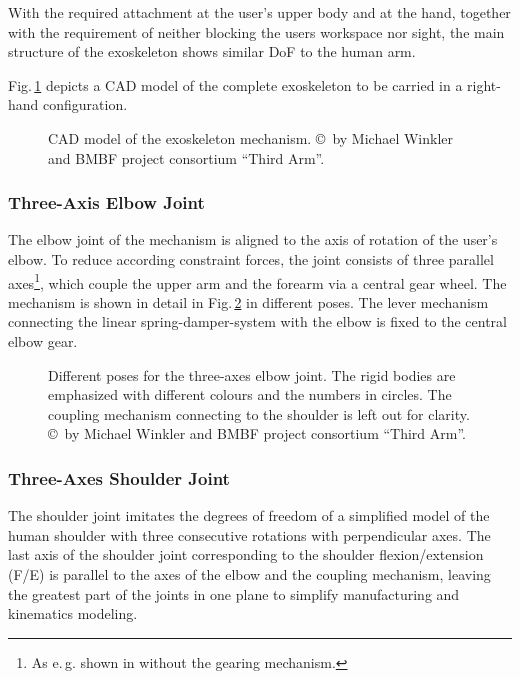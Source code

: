 \documentclass[twocolumn,10pt]{IFTOMM}
\begin{document}
With the required attachment at the user's upper body and at the hand, together with the requirement of neither blocking the users workspace nor sight, the main structure of the exoskeleton shows similar DoF to the human arm.

Fig.\,\ref{fig:KAS5_CAD} depicts a CAD model of the complete exoskeleton to be carried in a right-hand configuration.


\begin{figure}[tb!]
    
    \caption{CAD model of the exoskeleton mechanism. \copyright \, by Michael Winkler and BMBF project consortium ``Third Arm''.}
    \label{fig:KAS5_CAD}
\end{figure} 

\subsubsection{Three-Axis Elbow Joint}
\label{sec:exo_des_elbow}

The elbow joint of the mechanism is aligned to the axis of rotation of the user's elbow.
To reduce according constraint forces, the joint consists of three parallel axes\footnote{As e.\,g. shown in \cite{Pons2008} without the gearing mechanism.}, which couple the upper arm and the forearm via a central gear wheel.
The mechanism is shown in detail in Fig.\,\ref{fig:EllenbogenSimMech} in different poses.
The lever mechanism connecting the linear spring-damper-system with the elbow is fixed to the central elbow gear.

\begin{figure}[tb!]
    \small
    
    \caption{Different poses for the three-axes elbow joint. The rigid bodies are emphasized with different colours and the numbers in circles. The coupling mechanism connecting to the shoulder is left out for clarity. \copyright \, by Michael Winkler and BMBF project consortium ``Third Arm''.}
    \label{fig:EllenbogenSimMech}
\end{figure} 

\subsubsection{Three-Axes Shoulder Joint}
\label{sec:exo_des_shoulder}

The shoulder joint imitates the degrees of freedom of a simplified model of the human shoulder with three consecutive rotations with perpendicular axes.
The last axis of the shoulder joint corresponding to the shoulder flexion/extension (F/E) is parallel to the axes of the elbow and the coupling mechanism, leaving the greatest part of the joints in one plane to simplify manufacturing and kinematics modeling.
\end{document}
